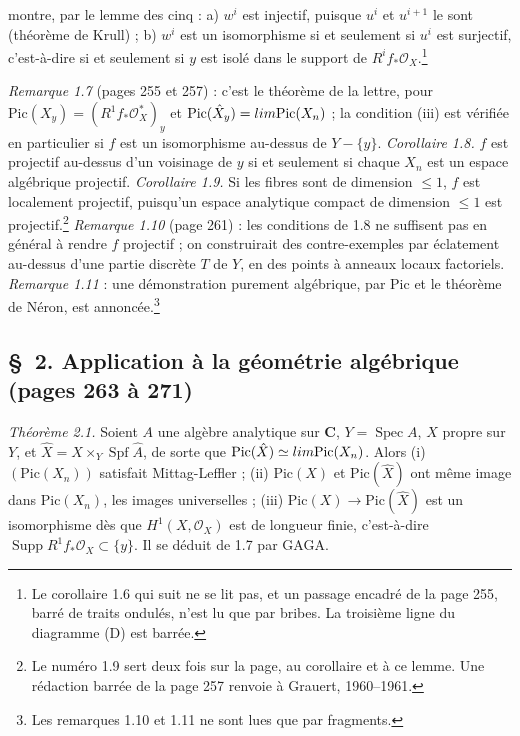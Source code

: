 \documentclass[11pt,a4paper]{article}
\begin{document}
montre, par le lemme des cinq : a) $w^i$ est injectif, puisque $u^i$ et
$u^{i+1}$ le sont (théorème de Krull) ; b) $w^i$ est un isomorphisme si et
seulement si $u^i$ est surjectif, c'est-à-dire si et seulement si $y$ est
isolé dans le support de $R^i f_*\mathcal{O}_X$.\footnote{Le corollaire 1.6 qui
suit ne se lit pas, et un passage encadré de la page 255, barré de traits
ondulés, n'est lu que par bribes. La troisième ligne du diagramme (D) est
barrée.}

\emph{Remarque 1.7} (pages 255 et 257) : c'est le théorème de la lettre, pour
$\mathrm{Pic}(X_y) = (R^1 f_*\mathcal{O}^*_X)_y$ et
$\mathrm{Pic}(\hat{X}_y) = \varprojlim \mathrm{Pic}(X_n)$ ; la condition (iii)
est vérifiée en particulier si $f$ est un isomorphisme au-dessus de
$Y - \{y\}$. \emph{Corollaire 1.8.} $f$ est projectif au-dessus d'un voisinage
de $y$ si et seulement si chaque $X_n$ est un espace algébrique projectif.
\emph{Corollaire 1.9.} Si les fibres sont de dimension $\leq 1$, $f$ est
localement projectif, puisqu'un espace analytique compact de dimension
$\leq 1$ est projectif.\footnote{Le numéro 1.9 sert deux fois sur la page, au
corollaire et à ce lemme. Une rédaction barrée de la page 257 renvoie à
Grauert, 1960--1961.} \emph{Remarque 1.10} (page 261) : les conditions de 1.8
ne suffisent pas en général à rendre $f$ projectif ; on construirait des
contre-exemples par éclatement au-dessus d'une partie discrète $T$ de $Y$, en
des points à anneaux locaux factoriels. \emph{Remarque 1.11} : une
démonstration purement algébrique, par $\mathrm{Pic}$ et le théorème de Néron,
est annoncée.\footnote{Les remarques 1.10 et 1.11 ne sont lues que par
fragments.}

\subsection*{§~2. Application à la géométrie algébrique (pages 263 à 271)}

\emph{Théorème 2.1.} Soient $A$ une algèbre analytique sur $\mathbf{C}$,
$Y = \operatorname{Spec} A$, $X$ propre sur $Y$, et
$\hat{X} = X \times_Y \operatorname{Spf}\hat{A}$, de sorte que
$\mathrm{Pic}(\hat{X}) \simeq \varprojlim \mathrm{Pic}(X_n)$. Alors (i)
$(\mathrm{Pic}(X_n))$ satisfait Mittag-Leffler ; (ii) $\mathrm{Pic}(X)$ et
$\mathrm{Pic}(\hat{X})$ ont même image dans $\mathrm{Pic}(X_n)$, les images
universelles ; (iii) $\mathrm{Pic}(X) \to \mathrm{Pic}(\hat{X})$ est un
isomorphisme dès que $H^1(X, \mathcal{O}_X)$ est de longueur finie, c'est-à-dire
$\operatorname{Supp} R^1 f_*\mathcal{O}_X \subset \{y\}$. Il se déduit de 1.7
par GAGA.
\end{document}
